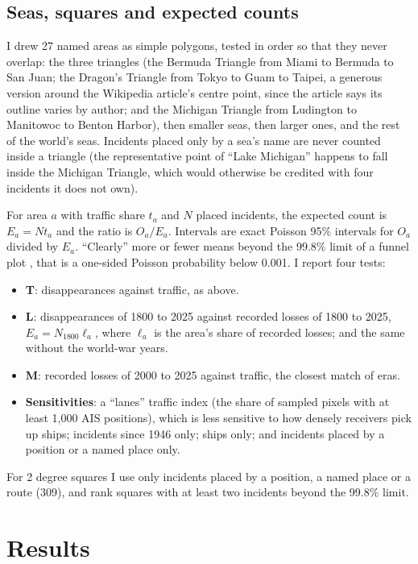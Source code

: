 \documentclass[11pt,a4paper]{article}
\begin{document}
\subsection{Seas, squares and expected counts}
I drew 27 named areas as simple polygons, tested in order so that they never overlap: the three triangles (the Bermuda Triangle from Miami to Bermuda to San Juan; the Dragon's Triangle from Tokyo to Guam to Taipei, a generous version around the Wikipedia article's centre point, since the article says its outline varies by author; and the Michigan Triangle from Ludington to Manitowoc to Benton Harbor), then smaller seas, then larger ones, and the rest of the world's seas. Incidents placed only by a sea's name are never counted inside a triangle (the representative point of ``Lake Michigan'' happens to fall inside the Michigan Triangle, which would otherwise be credited with four incidents it does not own).

For area $a$ with traffic share $t_a$ and $N$ placed incidents, the expected count is $E_a = N t_a$ and the ratio is $O_a/E_a$. Intervals are exact Poisson 95\% intervals for $O_a$ \citep{garwood} divided by $E_a$. ``Clearly'' more or fewer means beyond the 99.8\% limit of a funnel plot \citep{spiegelhalter}, that is a one-sided Poisson probability below 0.001. I report four tests:
\begin{itemize}
\item \textbf{T}: disappearances against traffic, as above.
\item \textbf{L}: disappearances of 1800 to 2025 against recorded losses of 1800 to 2025, $E_a = N_{1800} \ell_a$, where $\ell_a$ is the area's share of recorded losses; and the same without the world-war years.
\item \textbf{M}: recorded losses of 2000 to 2025 against traffic, the closest match of eras.
\item \textbf{Sensitivities}: a ``lanes'' traffic index (the share of sampled pixels with at least 1,000 AIS positions), which is less sensitive to how densely receivers pick up ships; incidents since 1946 only; ships only; and incidents placed by a position or a named place only.
\end{itemize}
For 2 degree squares I use only incidents placed by a position, a named place or a route (309), and rank squares with at least two incidents beyond the 99.8\% limit.

\section{Results}
\end{document}
